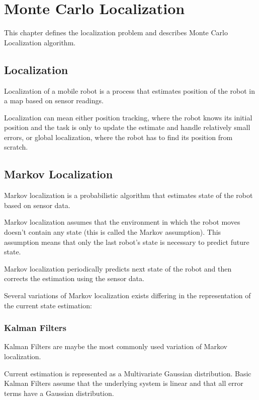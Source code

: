 \chapter{Monte Carlo Localization}
\label{chap:mcl}

This chapter defines the localization problem and describes Monte Carlo Localization algorithm.

\section{Localization}
Localization of a mobile robot is a process that estimates position of the robot
in a map based on sensor readings.

Localization can mean either position tracking, where the robot knows its initial
position and the task is only to update the estimate and handle relatively small
errors, or global localization, where the robot has to find its position from scratch.

\section{Markov Localization}

Markov localization is a probabilistic algorithm that estimates state of the
robot based on sensor data.

Markov localization assumes that the environment in which the robot moves
doesn't contain any state (this is called the Markov assumption).
This assumption means that only the last robot's state is necessary to predict
future state.

Markov localization periodically predicts next state of the robot and then
corrects the estimation using the sensor data.

Several variations of Markov localization exists differing in the
representation of the current state estimation:

\subsection{Kalman Filters}
\label{sec:kalman}

Kalman Filters \cite{kalman60,welch95} are maybe the most commonly used variation of Markov localization.

Current estimation is represented as a Multivariate Gaussian distribution.
Basic Kalman Filters assume that the underlying system is linear and that
all error terms have a Gaussian distribution.

